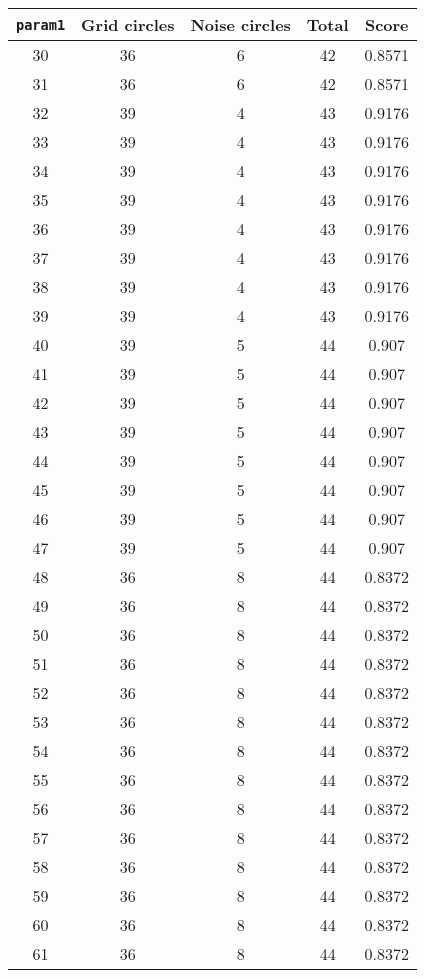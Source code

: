 \documentclass[letterpaper, 12pt]{article}
\begin{document}
\begin{longtable}{|c|c|c|c|c|}
\hline
\textbf{\texttt{param1}} & \textbf{Grid circles} & \textbf{Noise circles} & \textbf{Total} & \textbf{Score} \\
\hline
30 & 36 & 6 & 42 & 0.8571 \\
\hline
31 & 36 & 6 & 42 & 0.8571 \\
\hline
32 & 39 & 4 & 43 & 0.9176 \\
\hline
33 & 39 & 4 & 43 & 0.9176 \\
\hline
34 & 39 & 4 & 43 & 0.9176 \\
\hline
35 & 39 & 4 & 43 & 0.9176 \\
\hline
36 & 39 & 4 & 43 & 0.9176 \\
\hline
37 & 39 & 4 & 43 & 0.9176 \\
\hline
38 & 39 & 4 & 43 & 0.9176 \\
\hline
39 & 39 & 4 & 43 & 0.9176 \\
\hline
40 & 39 & 5 & 44 & 0.907 \\
\hline
41 & 39 & 5 & 44 & 0.907 \\
\hline
42 & 39 & 5 & 44 & 0.907 \\
\hline
43 & 39 & 5 & 44 & 0.907 \\
\hline
44 & 39 & 5 & 44 & 0.907 \\
\hline
45 & 39 & 5 & 44 & 0.907 \\
\hline
46 & 39 & 5 & 44 & 0.907 \\
\hline
47 & 39 & 5 & 44 & 0.907 \\
\hline
48 & 36 & 8 & 44 & 0.8372 \\
\hline
49 & 36 & 8 & 44 & 0.8372 \\
\hline
50 & 36 & 8 & 44 & 0.8372 \\
\hline
51 & 36 & 8 & 44 & 0.8372 \\
\hline
52 & 36 & 8 & 44 & 0.8372 \\
\hline
53 & 36 & 8 & 44 & 0.8372 \\
\hline
54 & 36 & 8 & 44 & 0.8372 \\
\hline
55 & 36 & 8 & 44 & 0.8372 \\
\hline
56 & 36 & 8 & 44 & 0.8372 \\
\hline
57 & 36 & 8 & 44 & 0.8372 \\
\hline
58 & 36 & 8 & 44 & 0.8372 \\
\hline
59 & 36 & 8 & 44 & 0.8372 \\
\hline
60 & 36 & 8 & 44 & 0.8372 \\
\hline
61 & 36 & 8 & 44 & 0.8372 \\

\end{longtable}
\end{document}
